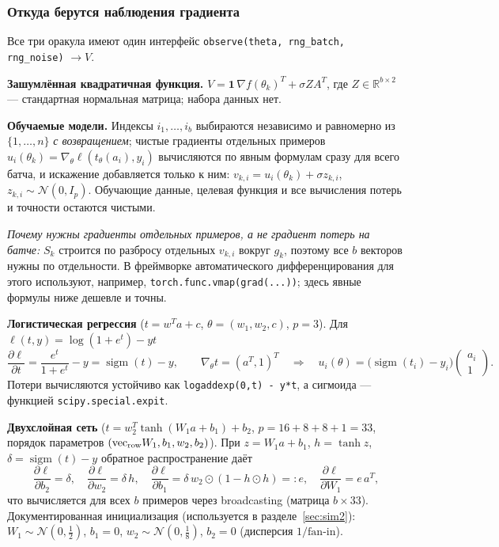 \documentclass[11pt,a4paper]{article}
\begin{document}
\subsubsection*{Откуда берутся наблюдения градиента}

Все три оракула имеют один интерфейс \texttt{observe(theta, rng\_batch, rng\_noise)}
$\to V$.

\textbf{Зашумлённая квадратичная функция.} $V=\mathbf 1\,\nabla f(\theta_k)^T+\sigma ZA^T$,
где $Z\in\mathbb R^{b\times2}$ — стандартная нормальная матрица; набора данных нет.

\textbf{Обучаемые модели.} Индексы $i_1,\dots,i_b$ выбираются независимо и равномерно из
$\{1,\dots,n\}$ \emph{с возвращением}; чистые градиенты отдельных примеров
$u_{i}(\theta_k)=\nabla_\theta\ell(t_\theta(a_{i}),y_{i})$ вычисляются по явным формулам
сразу для всего батча, и искажение добавляется только к ним:
$v_{k,i}=u_{i}(\theta_k)+\sigma z_{k,i}$, $z_{k,i}\sim\mathcal N(0,I_p)$. Обучающие
данные, целевая функция и все вычисления потерь и точности остаются чистыми.

\emph{Почему нужны градиенты отдельных примеров, а не градиент потерь на батче:}
$S_k$ строится по разбросу отдельных $v_{k,i}$ вокруг $g_k$, поэтому все $b$ векторов
нужны по отдельности. В фреймворке автоматического дифференцирования для этого
используют, например, \texttt{torch.func.vmap(grad(...))}; здесь явные формулы ниже
дешевле и точны.

\textbf{Логистическая регрессия} ($t=w^Ta+c$, $\theta=(w_1,w_2,c)$, $p=3$). Для
$\ell(t,y)=\log(1+e^t)-yt$
\begin{equation*}
\frac{\partial\ell}{\partial t}=\frac{e^t}{1+e^t}-y=\operatorname{sigm}(t)-y,\qquad
\nabla_\theta t=(a^T,1)^T\quad\Longrightarrow\quad
u_i(\theta)=\big(\operatorname{sigm}(t_i)-y_i\big)\begin{pmatrix}a_i\\1\end{pmatrix}.
\end{equation*}
Потери вычисляются устойчиво как \texttt{logaddexp(0,t)~-~y*t}, а сигмоида —
функцией \texttt{scipy.special.expit}.

\textbf{Двухслойная сеть} ($t=w_2^T\tanh(W_1a+b_1)+b_2$, $p=16+8+8+1=33$, порядок
параметров $(\mathrm{vec}_{\rm row}W_1,b_1,w_2,b_2)$). При $z=W_1a+b_1$, $h=\tanh z$,
$\delta=\operatorname{sigm}(t)-y$ обратное распространение даёт
\begin{equation*}
\frac{\partial\ell}{\partial b_2}=\delta,\quad
\frac{\partial\ell}{\partial w_2}=\delta\,h,\quad
\frac{\partial\ell}{\partial b_1}=\delta\,w_2\odot(1-h\odot h)=:e,\quad
\frac{\partial\ell}{\partial W_1}=e\,a^T,
\end{equation*}
что вычисляется для всех $b$ примеров через broadcasting (матрица $b\times33$).
Документированная инициализация (используется в разделе~\ref{sec:sim2}): $W_1\sim\mathcal N(0,\tfrac12)$,
$b_1=0$, $w_2\sim\mathcal N(0,\tfrac18)$, $b_2=0$ (дисперсия $1/\text{fan-in}$).
\end{document}
